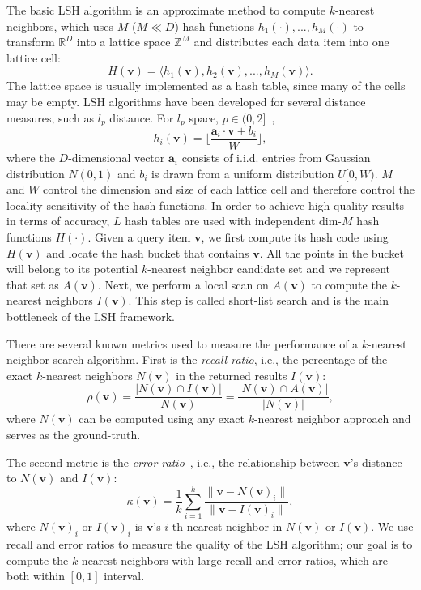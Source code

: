 The basic LSH algorithm is an approximate method to compute $k$-nearest neighbors, which uses $M$ ($M \ll D$) hash functions $h_1(\cdot), ..., h_M(\cdot)$ to transform $\mathbb{R}^D$ into a lattice space $\mathbb{Z}^M$ and distributes each data item into one lattice cell:
\begin{equation}
H(\mathbf v) = \langle h_1(\mathbf v), h_2(\mathbf v), ..., h_M(\mathbf v) \rangle.
\end{equation}
The lattice space is usually implemented as a hash table, since many of the cells may be empty. LSH algorithms have been developed for several distance measures, such as $l_p$ distance. For $l_p$ space, $p \in (0, 2]$~\cite{Datar:2004:LHS},
\begin{equation}
\label{eq:6:hash:basic}
h_i(\mathbf v) = \lfloor \frac{\mathbf a_i \cdot \mathbf v + b_i}{W} \rfloor,
\end{equation}
where the $D$-dimensional vector $\mathbf a_i$ consists of i.i.d. entries from Gaussian distribution $N(0, 1)$ and $b_i$ is drawn from a uniform distribution $U[0, W)$. $M$ and $W$ control the dimension and size of each lattice cell and therefore control the locality sensitivity of the hash functions.
In order to achieve high quality results in terms of accuracy, $L$ hash tables are used with independent dim-$M$ hash functions $H(\cdot)$. Given a query item $\mathbf v$, we first compute its hash code using $H(\mathbf v)$ and locate the hash bucket that contains $\mathbf v$. All the points in the bucket will belong to its potential $k$-nearest neighbor candidate set and we represent that set as $A(\mathbf v)$. Next, we perform a local scan on $A(\mathbf v)$ to compute the $k$-nearest neighbors $I(\mathbf v)$. This step is called short-list search and is the main bottleneck of the LSH framework.

There are several known metrics used to measure the performance of a $k$-nearest neighbor search algorithm. First is the \emph{recall ratio}, i.e., the percentage of the exact $k$-nearest neighbors $N(\mathbf v)$ in the returned results $I(\mathbf v)$:
\begin{equation}
\label{eq:6:recall}
\rho(\mathbf v) = \frac{|N(\mathbf v) \cap I(\mathbf v)|}{|N(\mathbf v)|} = \frac{|N(\mathbf v) \cap A(\mathbf v)|}{|N(\mathbf v)|},
\end{equation}
where $N(\mathbf v)$ can be computed using any exact $k$-nearest neighbor approach and serves as the ground-truth.

The second metric is the \emph{error ratio}~\cite{Gionis:vldb:99}, i.e., the relationship between $\mathbf v$'s distance to $N(\mathbf v)$ and $I(\mathbf v)$:
\begin{equation}
\label{eq:6:error}
\kappa(\mathbf v) = \frac{1}{k} \sum_{i=1}^k \frac{\|\mathbf v -N(\mathbf v)_i\|}{\| \mathbf v - I(\mathbf v)_i\|},
\end{equation}
where $N(\mathbf v)_i$ or $I(\mathbf v)_i$ is $\mathbf v$'s $i$-th nearest neighbor in $N(\mathbf v)$ or $I(\mathbf v)$. We use recall and error ratios to measure the quality of the LSH algorithm; our goal is to compute the $k$-nearest neighbors with large recall and error ratios, which are both within $[0, 1]$ interval.

